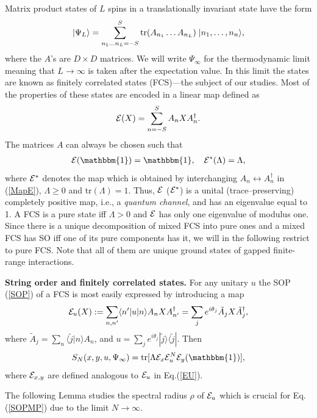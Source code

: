 \documentclass[prl,floatfix,showpacs,amsmat,twocolumn]{revtex4}
\newcommand{\be}{\begin{eqnarray}}
\newcommand{\ee}{\end{eqnarray}}
\newcommand{\1}{\mathbbm{1}}
\renewcommand{\>}{\rangle}
\newcommand{\<}{\langle}
\newcommand{\vs}{\vspace*{4pt}}
\begin{document}
Matrix product states of $L$ spins in a translationally invariant
state have the form
\be
    \label{MPS}
    |\Psi_L\rangle = \sum_{n_1\ldots n_L=-S}^S
    {\rm tr}(A_{n_1}\ldots A_{n_L}) \;|n_1,\ldots,n_n\rangle,
\ee
where the $A$'s are $D\times D$ matrices. We will write
$\Psi_\infty$ for the thermodynamic limit meaning that
$L\to\infty$ is taken after the expectation value. In this limit
the states are known as finitely correlated states
(FCS)\cite{FaNaWe}---the subject of our studies. Most of the
properties of these states are encoded in a linear map defined as
\be
    \label{MapE}
    {\cal E}(X)=\sum_{n=-S}^{S} A_n X A_n^\dagger.
\ee
The matrices $A$ can always be chosen such that
\be
    \label{fixed}
    {\cal E}(\1)=\1, \quad {\cal E}^*(\Lambda)=\Lambda,
\ee
where ${\cal E}^*$ denotes the map which is obtained by
interchanging $A_n\leftrightarrow A_n^\dagger$ in (\ref{MapE}),
$\Lambda\ge 0$ and tr$(\Lambda)=1$. Thus, ${\cal E}$ (${\cal
            E}^*$) is a unital (trace--preserving) completely positive map,
i.e., a \emph{quantum channel}, and has an eigenvalue equal to 1.
A FCS is a pure state iff $\Lambda>0$ and $\cal E$ has only one
eigenvalue of modulus one. Since there is a unique decomposition
\cite{FaNaWe} of mixed FCS into pure ones and a mixed FCS has SO
iff one of its pure components has it, we will in the following
restrict to pure FCS. Note that all of them are unique ground
states of gapped finite-range interactions. \vs

\textbf{String order and finitely correlated states.} For any
unitary $u$ the SOP (\ref{SOP}) of a FCS is most easily expressed
by introducing a map
\be
    \label{EU}
    {\cal E}_u(X) := \sum_{n,n'} \langle n'|u|n\rangle  A_{n} X
    A_{n'}^\dagger=\sum_{j} e^{i\theta_j} \tilde A_j X \tilde
    A_j^\dagger,
\ee
where $\tilde A_j = \sum_n \langle \tilde j|n\rangle A_n$, and
$u=\sum_j e^{i\theta_j} |\tilde j\rangle\langle \tilde j|$. Then
\cite{MPS-mother}
\be
    \label{SOPMP}
    S_N(x,y,u,\Psi_\infty) = {\rm tr}[\Lambda {\cal E}_x {\cal
    E}_u^N
    {\cal E}_y (\1)],
\ee
where ${\cal E}_{x,y}$ are defined analogous to ${\cal E}_u$ in
Eq.(\ref{EU}).

The following Lemma studies the spectral radius $\rho$ of ${\cal
            E}_u$ which is crucial for Eq.(\ref{SOPMP}) due to the limit
$N\rightarrow\infty$.
\end{document}
